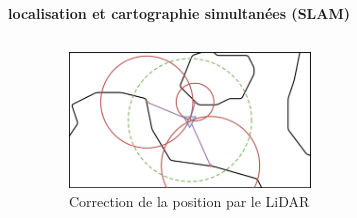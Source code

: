 \documentclass[aspectratio=169,10pt]{beamer}
\begin{document}
\begin{frame}{\textbf{localisation et cartographie simultanées (SLAM)}}
\begin{columns}[t]
\begin{column}{0.5\textwidth}
		\end{column}
		\begin{column}{0.5\textwidth}
			\begin{figure}
				\centering
				\includegraphics[width=0.6\textwidth]{IMAGES/lidar_correct_pos.png}
				\caption{Correction de la position par le LiDAR}
			\end{figure}
		\end{column}
	\end{columns}
		
\end{frame}
\end{document}
